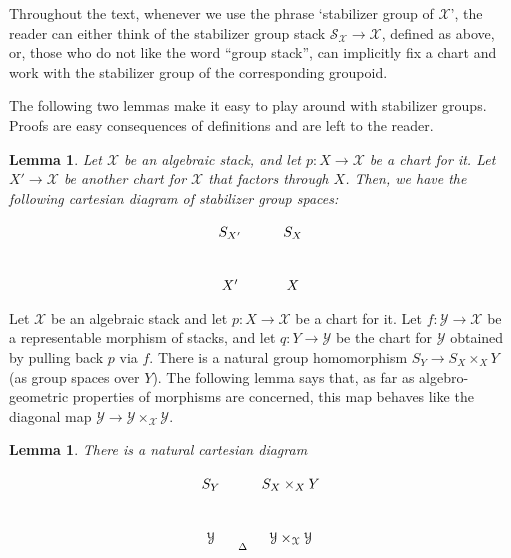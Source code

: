 \documentclass{amsart}
\newtheorem{lem}[thm]{Lemma}
\theoremstyle{definition}
\theoremstyle{remark}
\theoremstyle{remark}
\newcommand{\X}{\mathcal{X}}
\newcommand{\Y}{\mathcal{Y}}
\newcommand{\Ss}{\mathcal{S}}
\newcommand{\x}{\times}
\let\:=\colon
\begin{document}
Throughout the text, whenever we use the phrase `stabilizer group
of $\X$', the reader can either think of the  stabilizer group
stack $\Ss_{\X} \to \X$, defined as above, or,  those who do not
like the word ``group stack'', can implicitly  fix a chart and
work with the stabilizer group of the corresponding groupoid.

The following two lemmas make it easy to play around with
stabilizer groups. Proofs are  easy consequences of definitions
and are left to the reader.

\begin{lem}{\label{P4.7}}
Let $\X$ be an algebraic stack, and let $p \: X \to \X$ be a chart
for it. Let $X' \to \X$ be another  chart for $\X$ that factors
through $X$. Then, we have the following cartesian diagram of
stabilizer group spaces:

$$\xymatrix{ S_{X'} \ar[r] \ar[d] & S_X \ar[d] \\
             X' \ar[r] & X}$$
\end{lem}

Let $\X$ be an algebraic stack and let $p \: X \to \X$ be a chart
for it. Let $f \: \Y \to \X$ be a representable morphism of
stacks, and let $q \: Y \to \Y$ be the chart for $\Y$ obtained by
pulling back $p$ via $f$. There is a natural group homomorphism
$S_Y \to  S_X \x_X Y$ (as group spaces over $Y$). The following
lemma says that, as far as algebro-geometric properties of
morphisms are concerned, this map behaves like the diagonal map
$\Y \to \Y \x_{\X} \Y$.

\begin{lem}{\label{P4.8}}
There is a natural cartesian diagram

$$\xymatrix{ S_Y \ar[r] \ar[d] &  S_X \x_X Y \ar[d] \\
              \Y \ar[r]_(0.4){\Delta} & \Y \x_{\X} \Y } $$
\end{lem}
\end{document}
